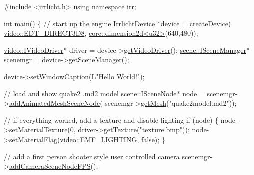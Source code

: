 \begin{DoxyCode}
\textcolor{preprocessor}{#include <\hyperlink{irrlicht_8h}{irrlicht.h}>}
\textcolor{keyword}{using namespace }\hyperlink{namespaceirr}{irr};

\textcolor{keywordtype}{int} main()
\{
 \textcolor{comment}{// start up the engine}
 \hyperlink{classirr_1_1IrrlichtDevice}{IrrlichtDevice} *device = \hyperlink{namespaceirr_abaf4d8719cc26b0d30813abf85e47c76}{createDevice}(
      \hyperlink{namespaceirr_1_1video_ae35a6de6d436c76107ad157fe42356d0a19a7bf582b8ea551a9cc4937e970ba8b}{video::EDT\_DIRECT3D8},
    \hyperlink{classirr_1_1core_1_1dimension2d}{core::dimension2d<u32>}(640,480));

 \hyperlink{classirr_1_1video_1_1IVideoDriver}{video::IVideoDriver}* driver = device->\hyperlink{classirr_1_1IrrlichtDevice_ada90707ba5c645d47e000e4e0f87c4c4}{getVideoDriver}();
 \hyperlink{classirr_1_1scene_1_1ISceneManager}{scene::ISceneManager}* scenemgr = device->\hyperlink{classirr_1_1IrrlichtDevice_a891b503ff4d5041296d88f23f97d7b3d}{getSceneManager}();

 device->\hyperlink{classirr_1_1IrrlichtDevice_a3d7c98d520bf18ce1973c6f1439a7c0f}{setWindowCaption}(L\textcolor{stringliteral}{"Hello World!"});

 \textcolor{comment}{// load and show quake2 .md2 model}
 \hyperlink{classirr_1_1scene_1_1ISceneNode}{scene::ISceneNode}* node = scenemgr->\hyperlink{classirr_1_1scene_1_1ISceneManager_a8e2e0cd3a27e85b4116855dd2f3365b8}{addAnimatedMeshSceneNode}(
    scenemgr->\hyperlink{classirr_1_1scene_1_1ISceneManager_a63894c3f3d46cfc385116f1705935e03}{getMesh}(\textcolor{stringliteral}{"quake2model.md2"}));

 \textcolor{comment}{// if everything worked, add a texture and disable lighting}
 \textcolor{keywordflow}{if} (node)
 \{
    node->\hyperlink{classirr_1_1scene_1_1ISceneNode_a0d5d2e05ebe08e6a432fbb4fd1d28dd0}{setMaterialTexture}(0, driver->\hyperlink{classirr_1_1video_1_1IVideoDriver_af4055165190e4adf221c6dc6f2434ea0}{getTexture}(\textcolor{stringliteral}{"texture.bmp"}));
    node->\hyperlink{classirr_1_1scene_1_1ISceneNode_a2841d5077854b9981711a403f33762cd}{setMaterialFlag}(\hyperlink{namespaceirr_1_1video_a8a3bc00ae8137535b9fbc5f40add70d3acea597a2692b8415486a464a7f954d34}{video::EMF\_LIGHTING}, \textcolor{keyword}{false});
 \}

 \textcolor{comment}{// add a first person shooter style user controlled camera}
 scenemgr->\hyperlink{classirr_1_1scene_1_1ISceneManager_ac312cbc85161678d00192880f2cdddbb}{addCameraSceneNodeFPS}();


\end{DoxyCode}
